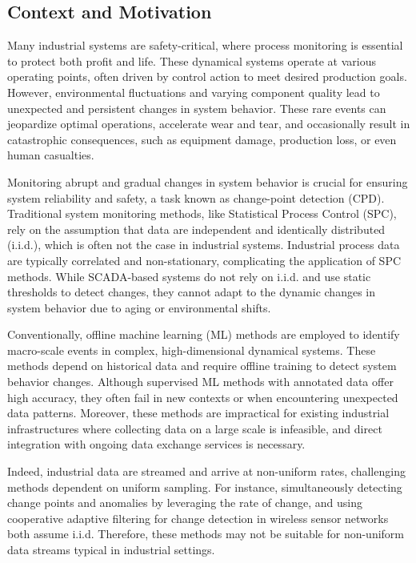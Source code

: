 \subsection{Context and Motivation}
Many industrial systems are safety-critical, where process monitoring is essential to protect both profit and life. These dynamical systems operate at various operating points, often driven by control action to meet desired production goals. However, environmental fluctuations and varying component quality lead to unexpected and persistent changes in system behavior. These rare events can jeopardize optimal operations, accelerate wear and tear, and occasionally result in catastrophic consequences, such as equipment damage, production loss, or even human casualties.

Monitoring abrupt and gradual changes in system behavior is crucial for ensuring system reliability and safety, a task known as change-point detection (CPD). Traditional system monitoring methods, like Statistical Process Control (SPC), rely on the assumption that data are independent and identically distributed (i.i.d.), which is often not the case in industrial systems. Industrial process data are typically correlated and non-stationary, complicating the application of SPC methods. While SCADA-based systems do not rely on i.i.d. and use static thresholds to detect changes, they cannot adapt to the dynamic changes in system behavior due to aging or environmental shifts.

Conventionally, offline machine learning (ML) methods are employed to identify macro-scale events in complex, high-dimensional dynamical systems. These methods depend on historical data and require offline training to detect system behavior changes. Although supervised ML methods with annotated data offer high accuracy, they often fail in new contexts or when encountering unexpected data patterns. Moreover, these methods are impractical for existing industrial infrastructures where collecting data on a large scale is infeasible, and direct integration with ongoing data exchange services is necessary.

Indeed, industrial data are streamed and arrive at non-uniform rates, challenging methods dependent on uniform sampling. For instance, \citet{Liu2023} simultaneously detecting change points and anomalies by leveraging the rate of change, and \citet{Fathy2019} using cooperative adaptive filtering for change detection in wireless sensor networks both assume i.i.d. Therefore, these methods may not be suitable for non-uniform data streams typical in industrial settings.

